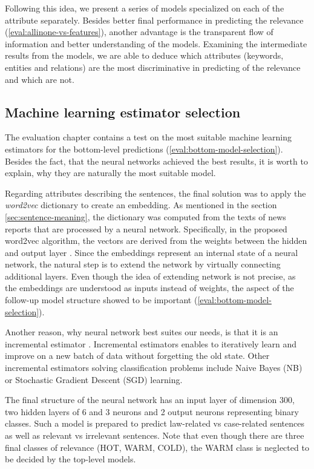 \documentclass[
  digital, %
  table,   %
  lof,     %
  lot,     %
]{fithesis3}
\begin{document}
Following this idea, we present a series of models specialized on each of the attribute separately.
Besides better final performance in predicting the relevance (\ref{eval:allinone-vs-features}), another advantage is the transparent flow of information and better understanding of the models.
Examining the intermediate results from the models, we are able to deduce which attributes (keywords, entities and relations) are the most discriminative in predicting of the relevance and which are not.

\subsection{Machine learning estimator selection}
\label{sec:bottom-level-nn}
The evaluation chapter contains a test on the most suitable machine learning estimators for the bottom-level predictions (\ref{eval:bottom-model-selection}).
Besides the fact, that the neural networks achieved the best results, it is worth to explain, why they are naturally the most suitable model.

Regarding attributes describing the sentences, the final solution was to apply the \textit{word2vec} dictionary to create an embedding.
As mentioned in the section \ref{sec:sentence-meaning}, the dictionary was computed from the texts of news reports that are processed by a neural network.
Specifically, in the proposed word2vec algorithm, the vectors are derived from the weights between the hidden and output layer \cite[sec. 2.2.1]{wordEmbeddings}.
Since the embeddings represent an internal state of a neural network, the natural step is to extend the network by virtually connecting additional layers.
Even though the idea of extending network is not precise, as the embeddings are understood as inputs instead of weights, the aspect of the follow-up model structure showed to be important (\ref{eval:bottom-model-selection}).

Another reason, why neural network best suites our needs, is that it is an incremental estimator \cite{incrementalScikit}.
Incremental estimators enables to iteratively learn and improve on a new batch of data without forgetting the old state.
Other incremental estimators solving classification problems include Naive Bayes (NB) or Stochastic Gradient Descent (SGD) learning.

The final structure of the neural network has an input layer of dimension 300, two hidden layers of 6 and 3 neurons and 2 output neurons representing binary classes.
Such a model is prepared to predict law-related vs case-related sentences as well as relevant vs irrelevant sentences. Note that even though there are three final classes of relevance (HOT, WARM, COLD), the WARM class is neglected to be decided by the top-level models.
\end{document}
